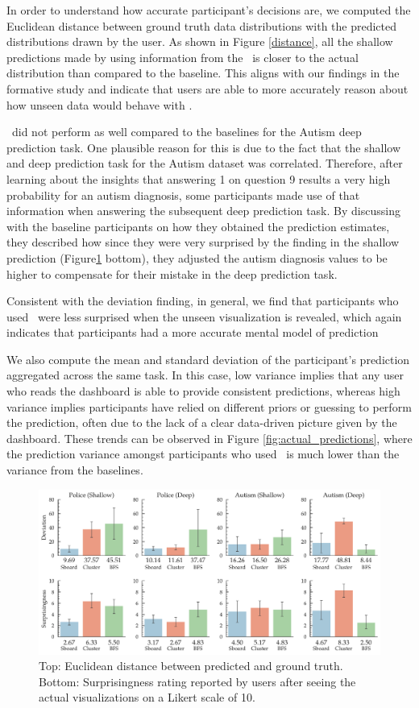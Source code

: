  In order to understand how accurate participant's decisions are, we computed the Euclidean distance between ground truth data distributions with the predicted distributions drawn by the user. As shown in Figure \ref{distance}, all the shallow predictions made by using information from the \system\ is closer to the actual distribution than compared to the baseline. This aligns with our findings in the formative study and indicate that users are able to more accurately reason about how unseen data would behave with \system.
\par \system\ did not perform as well compared to the baselines for the Autism deep prediction task. One plausible reason for this is due to the fact that the shallow and deep prediction task for the Autism dataset was correlated. Therefore, after learning about the insights that answering 1 on question 9 results a very high probability for an autism diagnosis, some participants made use of that information when answering the subsequent deep prediction task. By discussing with the baseline participants on how they obtained the prediction estimates, they described how since they were very surprised by the finding in the shallow prediction (Figure\ref{fig:distance} bottom), they adjusted the autism diagnosis values to be higher to compensate for their mistake in the deep prediction task. 
\par Consistent with the deviation finding, in general, we find that participants who used \system\ were less surprised when the unseen visualization is revealed, which again indicates that participants had a more accurate mental model of prediction 
\par We also compute the mean and standard deviation of the participant's prediction aggregated across the same task. In this case, low variance implies that any user who reads the dashboard is able to provide consistent predictions, whereas high variance implies participants have relied on different priors or guessing to perform the prediction, often due to the lack of a clear data-driven picture given by the dashboard. These trends can be observed in Figure \ref{fig:actual_predictions}, where the prediction variance amongst participants who used \system\ is much lower than the variance from the baselines.
\begin{figure}[bht]
\centering
\includegraphics[width=\linewidth]{figures/Devation_Surprisingness.pdf}
\caption{Top: Euclidean distance between predicted and ground truth. Bottom: Surprisingness rating reported by users after seeing the actual visualizations on a Likert scale of 10.}
\label{fig:distance}
\end{figure}
